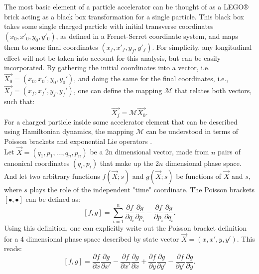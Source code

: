 The most basic element of a particle accelerator can be thought of as a LEGO® brick acting as a black box transformation for a single particle. This black box takes some single charged particle with initial transverse coordinates $\left( x_0,x'_0,y_0,y'_0 \right)$, as defined in a Frenet-Serret coordinate system, and maps them to some final coordinates $\left( x_f,x'_f,y_f,y'_f \right)$. For simplicity, any longitudinal effect will not be taken into account for this analysis, but can be easily incorporated. By gathering the initial coordinates into a vector, i.e. $\vec{X_0} = \left( x_0,x_0',y_0,y_0' \right)$, and doing the same for the final coordinates, i.e., $\vec{X_f} = \left( x_f,x_f',y_f,y_f' \right)$, one can define the mapping $\mathcal{M}$ that relates both vectors, such that:  
\begin{equation}
\label{eq:ch2map}
\vec{X_f}=\mathcal{M}\vec{X_0}.
\end{equation}
For a charged particle inside some accelerator element that can be described using Hamiltonian dynamics, the mapping $\mathcal{M}$ can be understood in terms of Poisson brackets and exponential Lie operators \cite{wolski,todd1,cernthesis1,cernthesis2,forest}.\\
Let $\vec{X} = \left( q_1,p_1,\dots,q_{n},p_{n} \right)$ be a 2n dimensional vector, made from $n$ pairs of canonical coordinates $(q_i,p_i)$ that make up the 2$n$ dimensional phase space. And let two arbitrary functions $f\left( \vec{X};s\right)$ and $g\left( \vec{X};s\right)$ be functions of $\vec{X}$ and $s$, where $s$ plays the role of the independent "time" coordinate. The Poisson brackets $\left[ \bullet , \bullet \right]$ can be defined as:
\begin{equation}
    \label{eq:ch2poisson}
    \left[ f,g \right] = \sum_{i=1}^{n} \frac{\partial f}{\partial q_i}\frac{\partial g}{\partial p_i} - \frac{\partial f}{\partial p_i}\frac{\partial g}{\partial q_i}. 
\end{equation}
Using this definition, one can explicitly write out the Poisson bracket definition for a 4 dimensional phase space described by state vector $\vec{X} = \left( x,x',y,y' \right)$. This reads: 
\begin{equation}
    \label{eq:ch2poisson1}
    \left[ f,g \right] = \frac{\partial f}{\partial x}\frac{\partial g}{\partial x'} - \frac{\partial f}{\partial x'}\frac{\partial g}{\partial x} + \frac{\partial f}{\partial y}\frac{\partial g}{\partial y'} - \frac{\partial f}{\partial y'}\frac{\partial g}{\partial y}. 
\end{equation}\\
